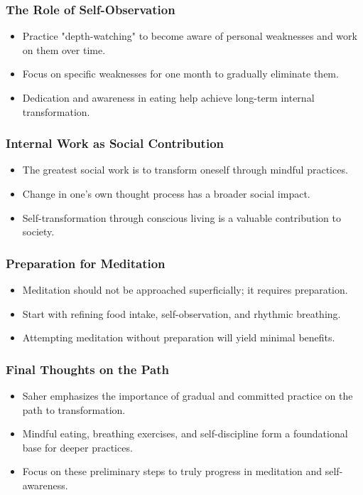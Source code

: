 \begin{frame}[fragile]\frametitle{The Role of Self-Observation}
    \begin{itemize}
        \item Practice "depth-watching" to become aware of personal weaknesses and work on them over time.
        \item Focus on specific weaknesses for one month to gradually eliminate them.
        \item Dedication and awareness in eating help achieve long-term internal transformation.
    \end{itemize}
\end{frame}

\begin{frame}[fragile]\frametitle{Internal Work as Social Contribution}
    \begin{itemize}
        \item The greatest social work is to transform oneself through mindful practices.
        \item Change in one's own thought process has a broader social impact.
        \item Self-transformation through conscious living is a valuable contribution to society.
    \end{itemize}
\end{frame}

\begin{frame}[fragile]\frametitle{Preparation for Meditation}
    \begin{itemize}
        \item Meditation should not be approached superficially; it requires preparation.
        \item Start with refining food intake, self-observation, and rhythmic breathing.
        \item Attempting meditation without preparation will yield minimal benefits.
    \end{itemize}
\end{frame}

\begin{frame}[fragile]\frametitle{Final Thoughts on the Path}
    \begin{itemize}
        \item Saher emphasizes the importance of gradual and committed practice on the path to transformation.
        \item Mindful eating, breathing exercises, and self-discipline form a foundational base for deeper practices.
        \item Focus on these preliminary steps to truly progress in meditation and self-awareness.
    \end{itemize}
\end{frame}


